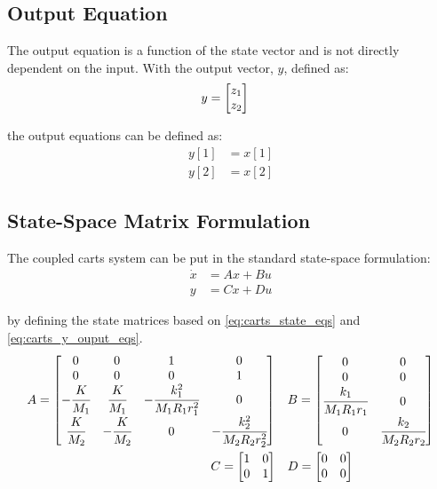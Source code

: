 \documentclass[]{article}
\begin{document}
	\subsection{Output Equation}
		The output equation is a function of the state vector and is not directly dependent on the input. With the output vector, $y$, defined as:
		\begin{align}
			y &= \mqty[z_1\\ z_2]\label{eq:carts_y_def}
		\end{align}
		
		the output equations can be defined as:
		\begin{equation}\label{eq:carts_y_ouput_eqs}
			\begin{aligned}
				y[1] &= x[1]\\
				y[2] &= x[2]
			\end{aligned}
		\end{equation}
	
	\subsection{State-Space Matrix Formulation}
		The coupled carts system can be put in the standard state-space formulation:
		\begin{equation}\label{eq:state_space_eqs_def}
			\begin{aligned}
				\dot{x} &= A x + B u\\
				y &= C x + D u
			\end{aligned}
		\end{equation}
		 
		 by defining the state matrices based on \eqref{eq:carts_state_eqs} and \eqref{eq:carts_y_ouput_eqs}.
		 \begin{equation}
 			\begin{aligned}
		 		A = \mqty[	0	& 0			& 1					& 0\\
					 		0	& 0	 		& 0					& 1\\
					 		-\cfrac{K}{M_1}	& \cfrac{K}{M_1}	& -\cfrac{k_1^2}{M_1 R_1 r_1^2}	& 0\\
					 		\cfrac{K}{M_2}	& -\cfrac{K}{M_2}	& 0								& -\cfrac{k_2^2}{M_2 R_2 r_2^2}
					 		] \ \ \
		 		&B = \mqty[ 0						& 0\\
					 		0						& 0\\
					 		\cfrac{k_1}{M_1 R_1 r_1}	& 0\\
					 		0						& \cfrac{k_2}{M_2 R_2 r_2}
					 		]\\
		 		C = \mqty[\dmat[0]{1,1}] \ \ \
		 		&D = \mqty[\zmat{2}{2}]
		 	\end{aligned}
	 		\label{eq:carts_state_matrices}
		 \end{equation}
	
\end{document}
